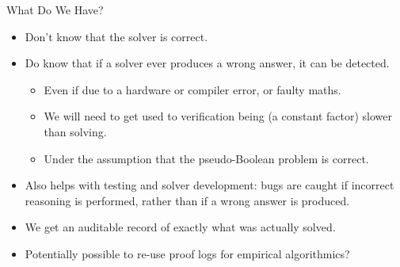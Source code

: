 \documentclass{beamer}
\begin{document}
\begin{frame}{What Do We Have?}
    \begin{itemize}
        \item Don't know that the solver is correct.
        \item Do know that if a solver ever produces a wrong answer, it can be detected.
            \begin{itemize}
                \item Even if due to a hardware or compiler error, or faulty maths.
                \item We will need to get used to verification being (a constant factor) slower than solving.\pause
                \item Under the assumption that the pseudo-Boolean problem is correct.
            \end{itemize} \pause
        \item Also helps with testing and solver development: bugs are caught if incorrect reasoning is performed,
            rather than if a wrong answer is produced. \pause
        \item We get an auditable record of exactly what was actually solved. \pause
        \item Potentially possible to re-use proof logs for empirical algorithmics?
    \end{itemize}
\end{frame}
\end{document}
